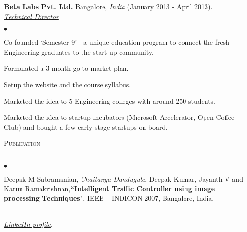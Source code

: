 \documentclass[a4paper]{article}
\newcommand{\lineunder}{\vspace*{-8pt} \\ \hspace*{-18pt} \hrulefill \\}
\newcommand{\header}[1]{{\hspace*{-15pt}\vspace*{6pt} \textsc{#1}} \vspace*{-6pt} \lineunder}
\newcommand{\employer}[4]{{ \textbf{#1} #2  (#3).\\ \underline{\emph{#4}}\\  }}
\newenvironment{achievements}{\begin{list}{$\bullet$}{\topsep 0pt \itemsep -2pt}}{\vspace*{4pt}\end{list}}
\begin{document}
\employer{Beta Labs Pvt. Ltd.}{Bangalore, \textit{India}}{January 2013 - April 2013}{Technical Director}
\begin{achievements}
\item Co-founded `Semester-9' - a unique education program to connect the fresh Engineering graduates to the start up community.
\item Formulated a 3-month go-to market plan.
\item Setup the website and the course syllabus.
\item Marketed the idea to 5 Engineering colleges with around 250 students.
\item Marketed the idea to startup incubators (Microsoft Accelerator, Open Coffee Club) and bought a few early stage startups on board.
\end{achievements}

\header{Publication}
\begin{achievements}
\item  Deepak M Subramanian, \emph{Chaitanya Dandugula}, Deepak Kumar, Jayanth V and Karun Ramakrishnan,\textbf{``Intelligent Traffic Controller using image processing Techniques"}, IEEE – INDICON 2007, Bangalore, India.
\end{achievements}

\hspace*{-18pt} \hrulefill \\
\textit{\href{https://www.linkedin.com/in/dandugula/}{LinkedIn profile}}.\\
\end{document}
